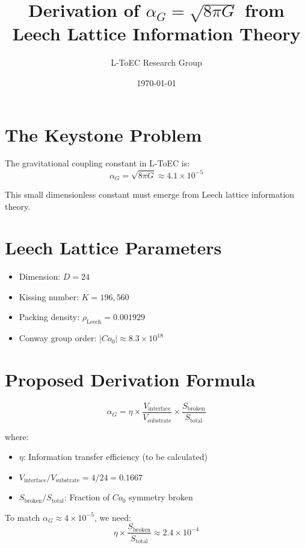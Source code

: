 \documentclass[11pt]{article}
\title{Derivation of $\alpha_G = \sqrt{8\pi G}$ from Leech Lattice Information Theory}
\author{L-ToEC Research Group}
\date{\today}
\begin{document}
\maketitle

\section{The Keystone Problem}

The gravitational coupling constant in L-ToEC is:
\begin{equation}
\alpha_G = \sqrt{8\pi G} \approx 4.1 \times 10^{-5}
\end{equation}

This small dimensionless constant must emerge from Leech lattice information theory.

\section{Leech Lattice Parameters}

\begin{itemize}
\item Dimension: $D = 24$
\item Kissing number: $K = 196,\!560$
\item Packing density: $\rho_{\text{Leech}} = 0.001929$
\item Conway group order: $|Co_0| \approx 8.3 \times 10^{18}$
\end{itemize}

\section{Proposed Derivation Formula}

\begin{equation}
\alpha_G = \eta \times \frac{V_{\text{interface}}}{V_{\text{substrate}}} \times \frac{S_{\text{broken}}}{S_{\text{total}}}
\end{equation}

where:
\begin{itemize}
\item $\eta$: Information transfer efficiency (to be calculated)
\item $V_{\text{interface}}/V_{\text{substrate}} = 4/24 = 0.1667$
\item $S_{\text{broken}}/S_{\text{total}}$: Fraction of $Co_0$ symmetry broken
\end{itemize}

To match $\alpha_G \approx 4\times 10^{-5}$, we need:
\begin{equation}
\eta \times \frac{S_{\text{broken}}}{S_{\text{total}}} \approx 2.4 \times 10^{-4}
\end{equation}
\end{document}
